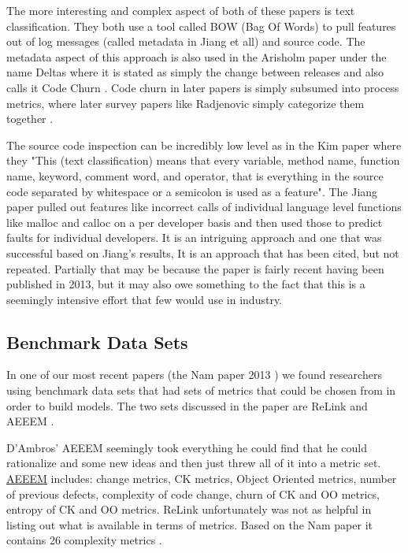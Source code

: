 \documentclass{sig-alternate-05-2015}
\begin{document}
The more interesting and complex aspect of both of these papers is text classification.  They both use a tool called BOW (Bag Of Words) to pull features out of log messages (called metadata in Jiang et all) and source code.  The metadata aspect of this approach is also used in the Arisholm paper under the name Deltas where it is stated as simply the change between releases and also calls it Code Churn \cite{Arisholm}.  Code churn in later papers is simply subsumed into process metrics, where later survey papers like Radjenovic simply categorize them together \cite{Radjenovic}.  

The source code inspection can be incredibly low level as in the Kim paper where they "This (text classification) means that every variable, method name, function name, keyword, comment word, and operator, that is everything  in the source code separated by whitespace or a semicolon is used as a feature"\cite{Kim}.  The Jiang paper pulled out features like incorrect calls of individual language level functions like malloc and calloc on a per developer basis and then used those to predict faults for individual developers.  It is an intriguing approach and one that was successful based on Jiang's results, It is an approach that has been cited, but not repeated.  Partially that may be because the paper is fairly recent having been published in 2013, but it may also owe something to the fact that this is a seemingly intensive effort that few would use in industry.

\subsection{Benchmark Data Sets}

In one of our most recent papers (the Nam paper 2013 \cite{Nam}) we found researchers using benchmark data sets that had sets of metrics that could be chosen from in order to build models.  The two sets discussed in the paper are ReLink and AEEEM \cite{Wu} \cite{DAmbros}.  

D'Ambros' AEEEM seemingly took everything he could find that he could rationalize and some new ideas and then just threw all of it into a metric set.  \href{http://bug.inf.usi.ch/}{AEEEM} includes: change metrics, CK metrics, Object Oriented metrics, number of previous defects, complexity of code change, churn of CK and OO metrics, entropy of CK and OO metrics.  ReLink unfortunately was not as helpful in listing out what is available in terms of metrics.  Based on the Nam paper it contains 26 complexity metrics \cite{Nam}.
\end{document}
